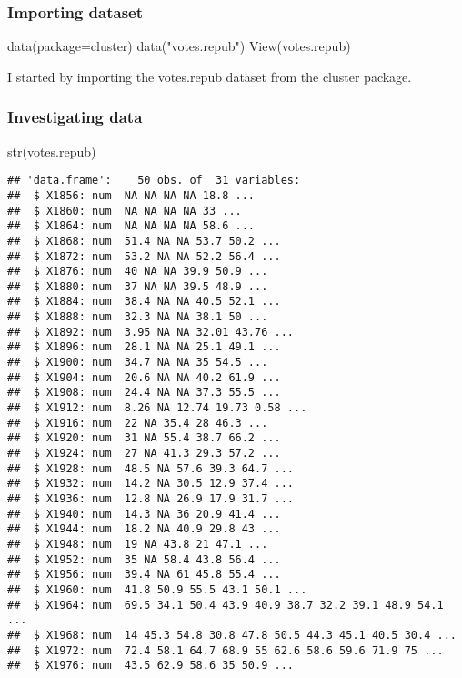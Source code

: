 \documentclass[
]{article}
\newenvironment{Shaded}{\begin{snugshade}}{\end{snugshade}}
\newcommand{\AttributeTok}[1]{\textcolor[rgb]{0.77,0.63,0.00}{#1}}
\newcommand{\FunctionTok}[1]{\textcolor[rgb]{0.00,0.00,0.00}{#1}}
\newcommand{\NormalTok}[1]{#1}
\newcommand{\StringTok}[1]{\textcolor[rgb]{0.31,0.60,0.02}{#1}}
\begin{document}
\hypertarget{importing-dataset}{%
\subsubsection{Importing dataset}\label{importing-dataset}}

\begin{Shaded}
\begin{Highlighting}[]
\FunctionTok{data}\NormalTok{(}\AttributeTok{package=}\StringTok{\textquotesingle{}cluster\textquotesingle{}}\NormalTok{)}
\FunctionTok{data}\NormalTok{(}\StringTok{"votes.repub"}\NormalTok{)}
\FunctionTok{View}\NormalTok{(votes.repub)}
\end{Highlighting}
\end{Shaded}

I started by importing the votes.repub dataset from the cluster package.

\hypertarget{investigating-data}{%
\subsubsection{Investigating data}\label{investigating-data}}

\begin{Shaded}
\begin{Highlighting}[]
\FunctionTok{str}\NormalTok{(votes.repub)}
\end{Highlighting}
\end{Shaded}

\begin{verbatim}
## 'data.frame':    50 obs. of  31 variables:
##  $ X1856: num  NA NA NA NA 18.8 ...
##  $ X1860: num  NA NA NA NA 33 ...
##  $ X1864: num  NA NA NA NA 58.6 ...
##  $ X1868: num  51.4 NA NA 53.7 50.2 ...
##  $ X1872: num  53.2 NA NA 52.2 56.4 ...
##  $ X1876: num  40 NA NA 39.9 50.9 ...
##  $ X1880: num  37 NA NA 39.5 48.9 ...
##  $ X1884: num  38.4 NA NA 40.5 52.1 ...
##  $ X1888: num  32.3 NA NA 38.1 50 ...
##  $ X1892: num  3.95 NA NA 32.01 43.76 ...
##  $ X1896: num  28.1 NA NA 25.1 49.1 ...
##  $ X1900: num  34.7 NA NA 35 54.5 ...
##  $ X1904: num  20.6 NA NA 40.2 61.9 ...
##  $ X1908: num  24.4 NA NA 37.3 55.5 ...
##  $ X1912: num  8.26 NA 12.74 19.73 0.58 ...
##  $ X1916: num  22 NA 35.4 28 46.3 ...
##  $ X1920: num  31 NA 55.4 38.7 66.2 ...
##  $ X1924: num  27 NA 41.3 29.3 57.2 ...
##  $ X1928: num  48.5 NA 57.6 39.3 64.7 ...
##  $ X1932: num  14.2 NA 30.5 12.9 37.4 ...
##  $ X1936: num  12.8 NA 26.9 17.9 31.7 ...
##  $ X1940: num  14.3 NA 36 20.9 41.4 ...
##  $ X1944: num  18.2 NA 40.9 29.8 43 ...
##  $ X1948: num  19 NA 43.8 21 47.1 ...
##  $ X1952: num  35 NA 58.4 43.8 56.4 ...
##  $ X1956: num  39.4 NA 61 45.8 55.4 ...
##  $ X1960: num  41.8 50.9 55.5 43.1 50.1 ...
##  $ X1964: num  69.5 34.1 50.4 43.9 40.9 38.7 32.2 39.1 48.9 54.1 ...
##  $ X1968: num  14 45.3 54.8 30.8 47.8 50.5 44.3 45.1 40.5 30.4 ...
##  $ X1972: num  72.4 58.1 64.7 68.9 55 62.6 58.6 59.6 71.9 75 ...
##  $ X1976: num  43.5 62.9 58.6 35 50.9 ...
\end{verbatim}
\end{document}
